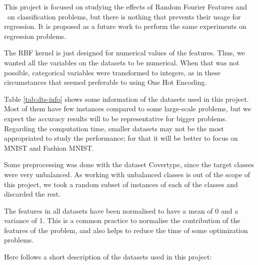 \begin{pre-delivery}
  This project is focused on studying the effects of Random Fourier Features
  and \Nys\ on classification problems, but there is nothing that prevents their
  usage for regression. It is proposed as a future work to perform the
  same experiments on regression problems.

  The RBF kernel is just designed for numerical values of the features. Thus, we
  wanted all the variables on the datasets to be numerical. When that was not
  possible, categorical variables were transformed to integers, as in these
  circumstances that seemed preferable to using One Hot Encoding.

  Table \ref{tab:dts-info} shows some information of the datasets used in this
  project. Most of them have few instances compared to some large-scale
  problems, but we expect the accuracy results will to be representative for
  bigger problems. Regarding the computation time, smaller datasets may not be
  the most appropriated to study the performance; for that it will be better to
  focus on MNIST and Fashion MNIST.

  Some preprocessing was done with the dataset Covertype, since the target classes
  were very unbalanced. As working with unbalanced classes is out of the scope
  of this project, we took a random subset of instances of each of the classes
  and discarded the rest.

  The features in all datasets have been normalised to have a mean of 0 and
  a variance of 1. This is a common practice to  normalise the contribution
  of the features of the problem, and also helps to reduce the time of
  some optimization problems.

  Here follows a short description of the datasets used in this project:


\end{pre-delivery}
